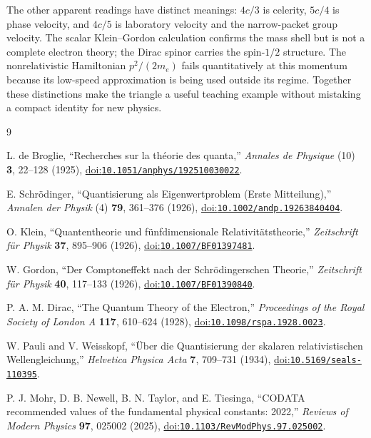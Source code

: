 \documentclass[12pt]{article}
\begin{document}
The other apparent readings have distinct meanings: $4c/3$ is celerity, $5c/4$ is phase velocity, and $4c/5$ is laboratory velocity and the narrow-packet group velocity. The scalar Klein--Gordon calculation confirms the mass shell but is not a complete electron theory; the Dirac spinor carries the spin-$1/2$ structure. The nonrelativistic Hamiltonian $p^2/(2m_e)$ fails quantitatively at this momentum because its low-speed approximation is being used outside its regime. Together these distinctions make the triangle a useful teaching example without mistaking a compact identity for new physics.

\begin{thebibliography}{9}
\small
{}
\raggedright
{}

L. de Broglie,
``Recherches sur la th\'eorie des quanta,''
\emph{Annales de Physique} (10) \textbf{3}, 22--128 (1925),
\href{https://doi.org/10.1051/anphys/192510030022}{doi:\nolinkurl{10.1051/anphys/192510030022}}.

E. Schr\"odinger,
``Quantisierung als Eigenwertproblem (Erste Mitteilung),''
\emph{Annalen der Physik} (4) \textbf{79}, 361--376 (1926),
\href{https://doi.org/10.1002/andp.19263840404}{doi:\nolinkurl{10.1002/andp.19263840404}}.

O. Klein,
``Quantentheorie und f\"unfdimensionale Relativit\"atstheorie,''
\emph{Zeitschrift f\"ur Physik} \textbf{37}, 895--906 (1926),
\href{https://doi.org/10.1007/BF01397481}{doi:\nolinkurl{10.1007/BF01397481}}.

W. Gordon,
``Der Comptoneffekt nach der Schr\"odingerschen Theorie,''
\emph{Zeitschrift f\"ur Physik} \textbf{40}, 117--133 (1926),
\href{https://doi.org/10.1007/BF01390840}{doi:\nolinkurl{10.1007/BF01390840}}.

P. A. M. Dirac,
``The Quantum Theory of the Electron,''
\emph{Proceedings of the Royal Society of London A} \textbf{117}, 610--624 (1928),
\href{https://doi.org/10.1098/rspa.1928.0023}{doi:\nolinkurl{10.1098/rspa.1928.0023}}.

W. Pauli and V. Weisskopf,
``\"Uber die Quantisierung der skalaren relativistischen Wellengleichung,''
\emph{Helvetica Physica Acta} \textbf{7}, 709--731 (1934),
\href{https://doi.org/10.5169/seals-110395}{doi:\nolinkurl{10.5169/seals-110395}}.

P. J. Mohr, D. B. Newell, B. N. Taylor, and E. Tiesinga,
``CODATA recommended values of the fundamental physical constants: 2022,''
\emph{Reviews of Modern Physics} \textbf{97}, 025002 (2025),
\href{https://doi.org/10.1103/RevModPhys.97.025002}{doi:\nolinkurl{10.1103/RevModPhys.97.025002}}.

\end{thebibliography}
\end{document}
